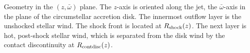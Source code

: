 \label{fig:sketch}
Geometry in the $(z,\bar{\omega})$ plane. The $z$-axis is oriented along the jet, the $\bar{\omega}$-axis in the plane of the circumstellar accretion disk. The innermost outflow layer is the unshocked stellar wind. The shock front is located at $R_{\rm{shock}}(z)$. The next layer is hot, post-shock stellar wind, which is separated from the disk wind by the contact discontinuity at $R_{\rm{contdisc}}(z)$.